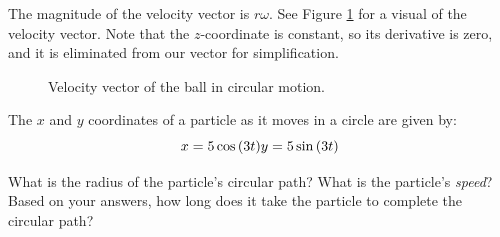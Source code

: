 The magnitude of the velocity vector is $r\omega$. See Figure \ref{fig:billardBallVelocity} for a visual of the velocity vector. Note that the $z$-coordinate is constant, so its derivative is zero, and it is eliminated from our vector for simplification.
\begin{figure}[H]
  \begin{center}
  \end{center}
  \caption{Velocity vector of the ball in circular motion.}
  \label{fig:billardBallVelocity}
\end{figure}

\begin{Exercise} The $x$ and $y$ coordinates of a particle as it moves in a circle are given by:
  $$x = 5\cos{\left( 3t \right)}\\
    y = 5\sin{\left( 3t \right)}$$

  What is the radius of the particle's circular path? What is the particle's \textit{speed}? Based on your answers, how long does it take the particle to complete the circular path?
  \vspace{50mm}
\end{Exercise}

